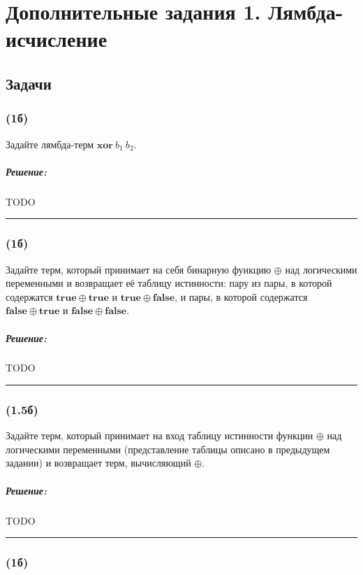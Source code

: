 \documentclass{article}
\newenvironment{proof}{\subparagraph{\hspace{-1em}Решение:\newline}}{\par\noindent\rule{\textwidth}{0.4pt}}
\begin{document}
    \section*{Дополнительные задания 1. Лямбда-исчисление}

    \subsection{Задачи}

    \subsubsection{(1б)}

    Задайте лямбда-терм $\mathbf{xor}~b_1~b_2$.

    \begin{proof}
        TODO %
    \end{proof}

    \subsubsection{(1б)}

    Задайте терм, который принимает на себя бинарную функцию $\oplus$ над
    логическими переменными и возвращает её таблицу истинности: пару из
    пары, в которой содержатся $\mathbf{true} \oplus \mathbf{true}$ и
    $\mathbf{true} \oplus \mathbf{false}$, и пары, в которой содержатся
    $\mathbf{false} \oplus \mathbf{true}$ и $\mathbf{false} \oplus
    \mathbf{false}$.

    \begin{proof}
        TODO %
    \end{proof}

    \subsubsection{(1.5б)}

    Задайте терм, который принимает на вход таблицу истинности функции
    $\oplus$ над логическими переменными (представление таблицы описано в
    предыдущем задании) и возвращает терм, вычисляющий $\oplus$.

    \begin{proof}
        TODO %
    \end{proof}

    \subsubsection{(1б)}
\end{document}
